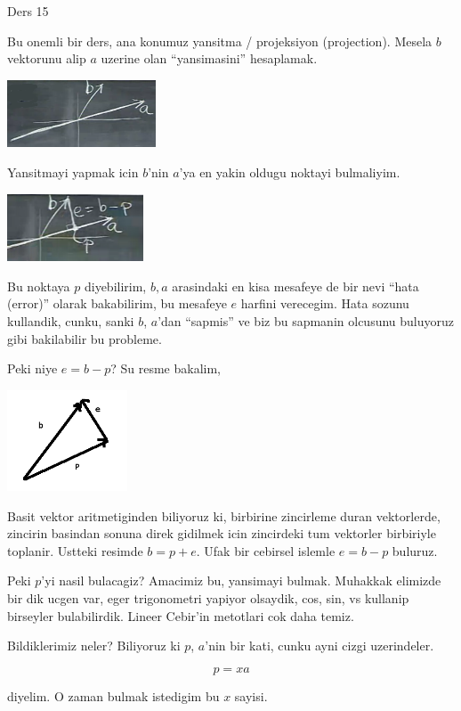 \documentclass[12pt,fleqn]{article}\usepackage{../common}
\begin{document}
Ders 15

Bu onemli bir ders, ana konumuz yansitma / projeksiyon (projection). Mesela
$b$ vektorunu alip $a$ uzerine olan ``yansimasini'' hesaplamak. 

\includegraphics[height=2cm]{15_1.png}

Yansitmayi yapmak icin $b$'nin $a$'ya en yakin oldugu noktayi bulmaliyim. 

\includegraphics[height=2cm]{15_2.png}

Bu noktaya $p$ diyebilirim, $b,a$ arasindaki en kisa mesafeye de bir nevi
``hata (error)''  olarak bakabilirim, bu mesafeye $e$ harfini
verecegim. Hata sozunu kullandik, cunku, sanki $b$, $a$'dan ``sapmis'' ve
biz bu sapmanin olcusunu buluyoruz gibi bakilabilir bu probleme. 

Peki niye $e = b-p$? Su resme bakalim, 

\includegraphics[height=3cm]{15_3.png}

Basit vektor aritmetiginden biliyoruz ki, birbirine zincirleme duran
vektorlerde, zincirin basindan sonuna direk gidilmek icin zincirdeki tum
vektorler birbiriyle toplanir. Ustteki resimde $b = p + e$. Ufak bir
cebirsel islemle $e = b - p$ buluruz. 

Peki $p$'yi nasil bulacagiz? Amacimiz bu, yansimayi bulmak. Muhakkak
elimizde bir dik ucgen var, eger trigonometri yapiyor olsaydik, cos, sin,
vs kullanip birseyler bulabilirdik. Lineer Cebir'in metotlari cok daha
temiz. 

Bildiklerimiz neler? Biliyoruz ki $p$, $a$'nin bir kati, cunku ayni cizgi
uzerindeler. 

\[ p = xa \]

diyelim. O zaman bulmak istedigim bu $x$ sayisi. 
\end{document}
